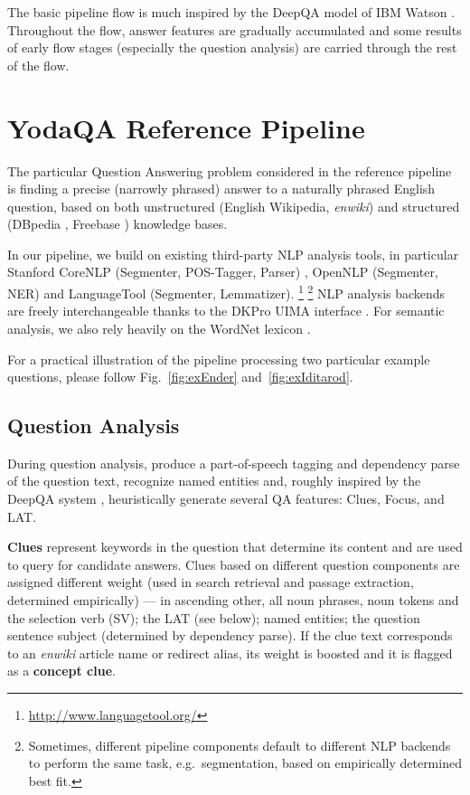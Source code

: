 \documentclass{poster15}
\begin{document}
The basic pipeline flow is much inspired by the Deep\-QA model
of IBM Watson \cite{WatsonPipeline}.  Throughout the flow, answer features
are gradually accumulated and some results of early flow stages (especially
the question analysis) are carried through the rest of the flow.


\section{YodaQA Reference Pipeline}
\label{sec:yodaqarefpip}

The particular Question Answering problem considered in the reference
pipeline is finding a precise (narrowly phrased) answer to a naturally
phrased English question, based on both unstructured (English Wikipedia,
\textit{enwiki})
and structured (DBpedia \cite{dbpedia}, Freebase \cite{freebase}) knowledge bases.

In our pipeline, we build on existing third-party NLP analysis tools,
in particular Stanford CoreNLP (Segmenter, POS-Tagger, Parser) \cite{StanfordCoreNLP} \cite{StanfordNNParser},
OpenNLP (Segmenter, NER) \cite{OpenNLP} and LanguageTool (Segmenter, Lemmatizer).%
\footnote{\url{http://www.languagetool.org/}}%
\footnote{Sometimes, different pipeline components default to different
NLP backends to perform the same task, e.g.\ segmentation,
based on empirically determined best fit.}
NLP analysis backends are freely interchangeable thanks
to the DKPro UIMA interface \cite{DKPro}.
For semantic analysis, we also rely heavily on the WordNet lexicon \cite{WordNet}.

For a practical illustration of the pipeline processing two particular example questions,
please follow Fig.~\ref{fig:exEnder} and~\ref{fig:exIditarod}.


\subsection{Question Analysis}

During question analysis,
produce a part-of-speech tagging and dependency parse of the question text,
recognize named entities and,
roughly inspired by the DeepQA system \cite{WatsonQuestion},
heuristically generate several QA features: Clues, Focus, and LAT.

\textbf{Clues} represent keywords in the question that determine its content
and are used to query for candidate answers.
Clues based on different question components are assigned different weight
(used in search retrieval and passage extraction, determined empirically) ---
in ascending other, all noun phrases, noun tokens and the selection verb (SV);
the LAT (see below);
named entities;
the question sentence subject (determined by dependency parse).
If the clue text corresponds to an \textit{enwiki} article name or redirect alias,
its weight is boosted and it is flagged as a \textbf{concept clue}.
\end{document}
